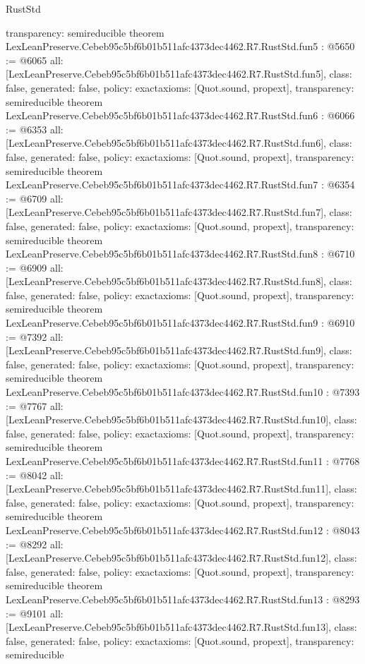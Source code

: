 \begin{lexlean}{RustStd}
\begin{coremodule}
{  transparency: semireducible
}
theorem LexLeanPreserve.Cebeb95c5bf6b01b511afc4373dec4462.R7.RustStd.fun5 : @5650 := @6065 {
  all: [LexLeanPreserve.Cebeb95c5bf6b01b511afc4373dec4462.R7.RustStd.fun5],
  class: false,
  generated: false,
  policy: exact{axioms: [Quot.sound, propext]},
  transparency: semireducible
}
theorem LexLeanPreserve.Cebeb95c5bf6b01b511afc4373dec4462.R7.RustStd.fun6 : @6066 := @6353 {
  all: [LexLeanPreserve.Cebeb95c5bf6b01b511afc4373dec4462.R7.RustStd.fun6],
  class: false,
  generated: false,
  policy: exact{axioms: [Quot.sound, propext]},
  transparency: semireducible
}
theorem LexLeanPreserve.Cebeb95c5bf6b01b511afc4373dec4462.R7.RustStd.fun7 : @6354 := @6709 {
  all: [LexLeanPreserve.Cebeb95c5bf6b01b511afc4373dec4462.R7.RustStd.fun7],
  class: false,
  generated: false,
  policy: exact{axioms: [Quot.sound, propext]},
  transparency: semireducible
}
theorem LexLeanPreserve.Cebeb95c5bf6b01b511afc4373dec4462.R7.RustStd.fun8 : @6710 := @6909 {
  all: [LexLeanPreserve.Cebeb95c5bf6b01b511afc4373dec4462.R7.RustStd.fun8],
  class: false,
  generated: false,
  policy: exact{axioms: [Quot.sound, propext]},
  transparency: semireducible
}
theorem LexLeanPreserve.Cebeb95c5bf6b01b511afc4373dec4462.R7.RustStd.fun9 : @6910 := @7392 {
  all: [LexLeanPreserve.Cebeb95c5bf6b01b511afc4373dec4462.R7.RustStd.fun9],
  class: false,
  generated: false,
  policy: exact{axioms: [Quot.sound, propext]},
  transparency: semireducible
}
theorem LexLeanPreserve.Cebeb95c5bf6b01b511afc4373dec4462.R7.RustStd.fun10 : @7393 := @7767 {
  all: [LexLeanPreserve.Cebeb95c5bf6b01b511afc4373dec4462.R7.RustStd.fun10],
  class: false,
  generated: false,
  policy: exact{axioms: [Quot.sound, propext]},
  transparency: semireducible
}
theorem LexLeanPreserve.Cebeb95c5bf6b01b511afc4373dec4462.R7.RustStd.fun11 : @7768 := @8042 {
  all: [LexLeanPreserve.Cebeb95c5bf6b01b511afc4373dec4462.R7.RustStd.fun11],
  class: false,
  generated: false,
  policy: exact{axioms: [Quot.sound, propext]},
  transparency: semireducible
}
theorem LexLeanPreserve.Cebeb95c5bf6b01b511afc4373dec4462.R7.RustStd.fun12 : @8043 := @8292 {
  all: [LexLeanPreserve.Cebeb95c5bf6b01b511afc4373dec4462.R7.RustStd.fun12],
  class: false,
  generated: false,
  policy: exact{axioms: [Quot.sound, propext]},
  transparency: semireducible
}
theorem LexLeanPreserve.Cebeb95c5bf6b01b511afc4373dec4462.R7.RustStd.fun13 : @8293 := @9101 {
  all: [LexLeanPreserve.Cebeb95c5bf6b01b511afc4373dec4462.R7.RustStd.fun13],
  class: false,
  generated: false,
  policy: exact{axioms: [Quot.sound, propext]},
  transparency: semireducible
}
\end{coremodule}
\end{lexlean}
